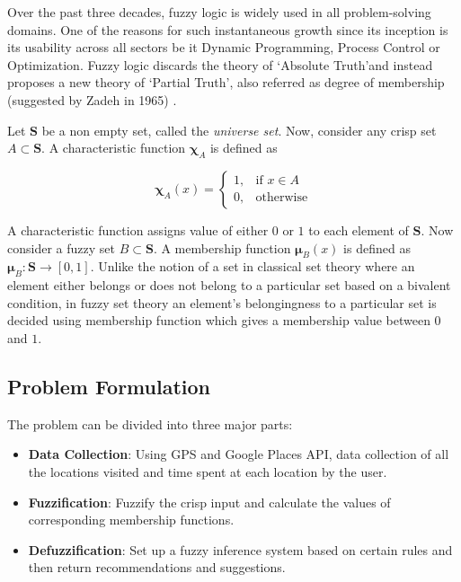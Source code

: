 \documentclass[conference]{IEEEtran}
\begin{document}
Over the past three decades, fuzzy logic is widely used in all problem-solving domains. One of the reasons for such instantaneous growth since its inception is its usability across all sectors be it Dynamic Programming, Process Control or Optimization. Fuzzy logic discards the theory of \lq Absolute Truth\rq and instead proposes a new theory of \lq Partial Truth\rq, also referred as degree of membership (suggested by Zadeh in 1965) \cite{ZADEH1965338}.

Let $\mathbf{S}$ be a non empty set, called the \textit{universe set}. Now, consider any crisp set $A \subset \mathbf{S}$. A characteristic function $\mathbold{\chi}_A$ is defined as

$$
\mathbold{\chi}_A(x) = 
\begin{cases}
    1, & \text{if } x\in A\\
    0, & \text{otherwise}
\end{cases}
$$

A characteristic function assigns value of either $0$ or $1$ to each element of $\mathbf{S}$. Now consider a fuzzy set $B \subset \mathbf{S}$. A membership function $\mathbold{\mu}_B(x)$ is defined as $\mathbold{\mu}_B:\mathbf{S}\rightarrow[0, 1]$. Unlike the notion of a set in classical set theory where an element either belongs or does not belong to a particular set based on a bivalent condition, in fuzzy set\cite{Klir:1996:FSF:234347} theory an element\rq s belongingness to a particular set is decided using membership function which gives a membership value between $0$ and $1$.

\subsection{Problem Formulation}

The problem can be divided into three major parts:

\begin{itemize}
\item \textbf{Data Collection}: Using GPS and Google Places API, data collection of all the locations visited and time spent at each location by the user.
\item \textbf{Fuzzification}: Fuzzify the crisp input and calculate the values of corresponding membership functions.
\item \textbf{Defuzzification}: Set up a fuzzy inference system based on certain rules and then return recommendations and suggestions.
\end{itemize}
\end{document}
